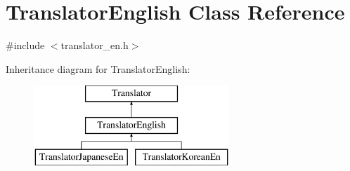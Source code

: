 \hypertarget{class_translator_english}{}\section{Translator\+English Class Reference}
\label{class_translator_english}


{\ttfamily \#include $<$translator\+\_\+en.\+h$>$}

Inheritance diagram for Translator\+English\+:\begin{figure}[H]
\begin{center}
\leavevmode
\includegraphics[height=3.000000cm]{class_translator_english}
\end{center}
\end{figure}
